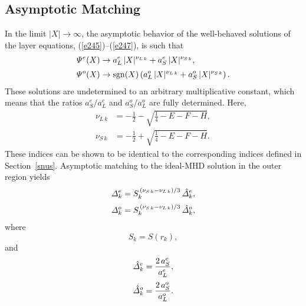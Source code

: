 \documentclass[12pt,prb,aps,notitlepage]{revtex4-1}
\begin{document}
\subsection{Asymptotic Matching}
In the limit $|X|\rightarrow \infty$, the asymptotic behavior of the well-behaved solutions of the layer equations, 
(\ref{e245})--(\ref{e247}),  is such that
\begin{align}
{\mit\Psi}^e(X)&\rightarrow a_L^e\,|X|^{\nu_{L\,k}} + a_S^e\,|X|^{\nu_{S\,k}},\\[0.5ex]
{\mit\Psi}^o(X)&\rightarrow {\rm sgn}(X)\left(a_L^o\,|X|^{\nu_{L\,k}} + a_S^o\,|X|^{\nu_{S\,k}}\right).
\end{align}
These solutions are undetermined to an arbitrary multiplicative constant, which means that the ratios
$a_S^e/a_L^e$ and $a_S^o/a_L^o$ are fully determined. 
Here,
\begin{align}
\nu_{L\,k} &= -\frac{1}{2}-\sqrt{\frac{1}{4} - E-F-H},\\[0.5ex]
\nu_{S\,k} &= -\frac{1}{2}+ \sqrt{\frac{1}{4} - E-F-H}.
\end{align}
These indices can be shown to be identical to the corresponding indices defined in Section~\ref{snus}. 
Asymptotic matching to the ideal-MHD solution in the outer region yields
\begin{align}\label{e252}
{\mit\Delta}_k^e& = S_k^{\,(\nu_{S\,k}-\nu_{L\,k})/3}\,\hat{\mit\Delta}_k^e,\\[0.5ex]
{\mit\Delta}_k^o &= S_k^{\,(\nu_{S\,k}-\nu_{L\,k})/3}\,\hat{\mit\Delta}_k^o,
\end{align}
where 
\begin{equation}
S_k = S(r_k),
\end{equation}
and 
\begin{align}
\hat{\mit\Delta}_k^e &= \frac{2\,a_S^e}{a_L^e},\\[0.5ex]
\hat{\mit\Delta}_k^o &= \frac{2\,a_S^o}{a_L^o}.
\end{align}
\end{document}
